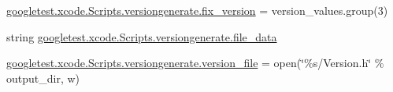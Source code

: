\begin{DoxyCompactItemize}
\item 
\mbox{\hyperlink{namespacegoogletest_1_1xcode_1_1_scripts_1_1versiongenerate_a6eac23b91d1ceace3963a751e68700d5}{googletest.\+xcode.\+Scripts.\+versiongenerate.\+fix\+\_\+version}} = version\+\_\+values.\+group(3)
\item 
string \mbox{\hyperlink{namespacegoogletest_1_1xcode_1_1_scripts_1_1versiongenerate_a15f442dc24035c601554b4029661b20e}{googletest.\+xcode.\+Scripts.\+versiongenerate.\+file\+\_\+data}}
\item 
\mbox{\hyperlink{namespacegoogletest_1_1xcode_1_1_scripts_1_1versiongenerate_a3f21ed2a20fc06ee762699370d9fc87f}{googletest.\+xcode.\+Scripts.\+versiongenerate.\+version\+\_\+file}} = open(\char`\"{}\%s/Version.\+h\char`\"{} \% output\+\_\+dir, \textquotesingle{}w\textquotesingle{})
\end{DoxyCompactItemize}
